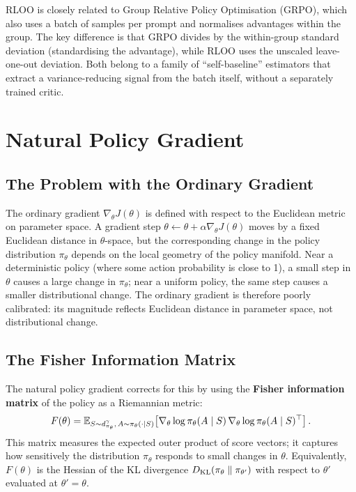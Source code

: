 \begin{remark}
\label{rem:rloo-grpo}
RLOO is closely related to Group Relative Policy Optimisation (GRPO), which also uses a batch of samples per prompt and normalises advantages within the group.  The key difference is that GRPO divides by the within-group standard deviation (standardising the advantage), while RLOO uses the unscaled leave-one-out deviation.  Both belong to a family of ``self-baseline'' estimators that extract a variance-reducing signal from the batch itself, without a separately trained critic.
\end{remark}

\section{Natural Policy Gradient}
\label{sec:npg}


\subsection{The Problem with the Ordinary Gradient}

The ordinary gradient $\nabla_\theta J(\theta)$ is defined with respect to the Euclidean metric on parameter space.  A gradient step $\theta \leftarrow \theta + \alpha \nabla_\theta J(\theta)$ moves by a fixed Euclidean distance in $\theta$-space, but the corresponding change in the policy distribution $\pi_\theta$ depends on the local geometry of the policy manifold.  Near a deterministic policy (where some action probability is close to 1), a small step in $\theta$ causes a large change in $\pi_\theta$; near a uniform policy, the same step causes a smaller distributional change.  The ordinary gradient is therefore poorly calibrated: its magnitude reflects Euclidean distance in parameter space, not distributional change.

\subsection{The Fisher Information Matrix}


The natural policy gradient corrects for this by using the \textbf{Fisher information matrix} of the policy as a Riemannian metric:
\begin{equation}
\label{eq:fisher}
F(\theta) = \operatorname{\mathbb{E}}_{S \sim d^{\gamma}_{\pi_\theta},\, A \sim \pi_\theta(\cdot \mid S)}\!\left[\nabla_\theta \log \pi_\theta(A \mid S)\, \nabla_\theta \log \pi_\theta(A \mid S)^\top\right].
\end{equation}
This matrix measures the expected outer product of score vectors; it captures how sensitively the distribution $\pi_\theta$ responds to small changes in $\theta$.  Equivalently, $F(\theta)$ is the Hessian of the KL divergence $D_{\mathrm{KL}}\!\left(\pi_\theta\;\|\;\pi_{\theta'}\right)$ with respect to $\theta'$ evaluated at $\theta' = \theta$.

